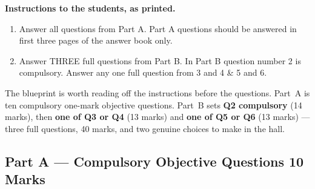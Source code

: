\begin{note}
\textbf{\sffamily Instructions to the students, as printed.}
\begin{enumerate}[leftmargin=1.6em,itemsep=2pt,topsep=4pt]
\item Answer all questions from Part A. Part A questions should be answered in
      first three pages of the answer book only.
\item Answer THREE full questions from Part B. In Part B question number 2 is
      compulsory. Answer any one full question from 3 and 4 \& 5 and 6.
\end{enumerate}
\end{note}

The blueprint is worth reading off the instructions before the questions.
Part~A is ten compulsory one-mark objective questions. Part~B sets
\textbf{Q2 compulsory} (14 marks), then \textbf{one of Q3 or Q4} (13 marks) and
\textbf{one of Q5 or Q6} (13 marks) --- three full questions, 40 marks, and two
genuine choices to make in the hall.

\subsection*{Part A --- Compulsory Objective Questions \hfill 10 Marks}

